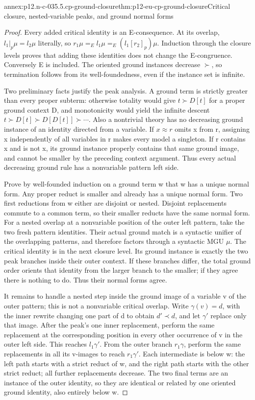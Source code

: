\begin{annexitem}{annex:p12.n-c-035.5.cp-ground-closure}{thm:p12-eu-cp-ground-closure}{Critical closure, nested-variable peaks, and ground normal forms}
\begin{proof}
Every added critical identity is an E-consequence. At its overlap,
\(l_1|_p\mu=l_2\mu\) literally, so
\(r_1\mu=_E l_1\mu=_E(l_1[r_2]_p)\mu\).
Induction through the closure levels proves that adding these identities
does not change the E-congruence. Conversely E is included. The
oriented ground instances decrease \(\succ\), so termination follows
from its well-foundedness, even if the instance set is infinite.

Two preliminary facts justify the peak analysis. A ground term is
strictly greater than every proper subterm: otherwise totality would
give \(t\succ D[t]\) for a proper ground context D, and monotonicity
would yield the infinite descent
\(t\succ D[t]\succ D[D[t]]\succ\cdots\).
Also a nontrivial theory has no decreasing ground instance of an
identity directed from a variable. If \(x\approx r\) omits x
from r, assigning x independently of all variables in r makes every
model a singleton. If r contains x and is not x, its ground instance
properly contains that same ground image, and cannot be smaller by
the preceding context argument. Thus every actual decreasing
ground rule has a nonvariable pattern left side.

Prove by well-founded induction on a ground term w that w has a
unique normal form. Any proper reduct is smaller and already has a
unique normal form. Two first reductions from w either are disjoint
or nested. Disjoint replacements commute to a common term, so their
smaller reducts have the same normal form. For a nested overlap at a
nonvariable position of the outer left pattern, take the two fresh
pattern identities. Their actual ground match is a syntactic unifier
of the overlapping patterns, and therefore factors through a syntactic
MGU \(\mu\). The critical identity is in the next closure level.
Its ground instance is exactly the two peak branches inside their
outer context. If these branches differ, the total ground order
orients that identity from the larger branch to the smaller; if
they agree there is nothing to do. Thus their normal forms agree.

It remains to handle a nested step inside the ground image of a
variable v of the outer pattern; this is not a nonvariable critical
overlap. Write \(\gamma(v)=d\), with the inner rewrite changing
one part of d to obtain \(d'\prec d\), and let \(\gamma'\)
replace only that image. After the peak's one inner replacement,
perform the same replacement at the corresponding position in every
other occurrence of v in the outer left side. This reaches
\(l_1\gamma'\). From the outer branch \(r_1\gamma\), perform
the same replacements in all its v-images to reach \(r_1\gamma'\).
Each intermediate is below w: the left path starts with a strict
reduct of w, and the right path starts with the other strict reduct;
all further replacements decrease. The two final terms are an
instance of the outer identity, so they are identical or related by
one oriented ground identity, also entirely below w.


\end{proof}
\end{annexitem}
